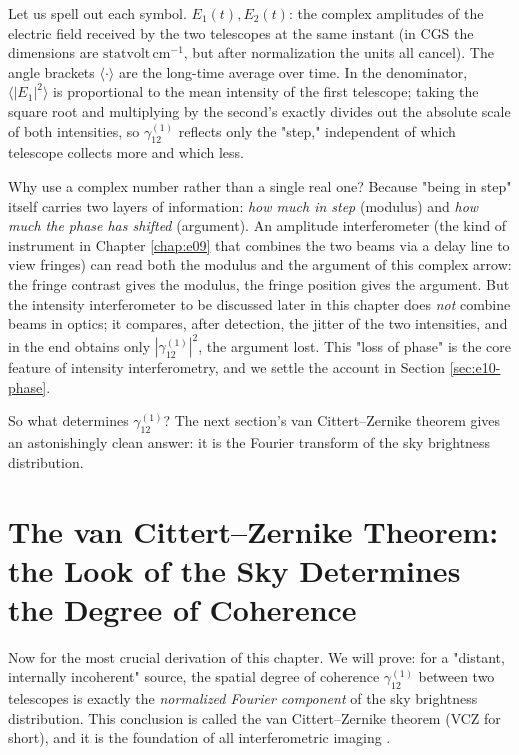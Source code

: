 Let us spell out each symbol. \(E_1(t),E_2(t)\): the complex amplitudes of the electric field received by the two telescopes at the same instant (in CGS the dimensions are \(\mathrm{statvolt\,cm^{-1}}\), but after normalization the units all cancel). The angle brackets \(\langle\cdot\rangle\) are the long-time average over time. In the denominator, \(\langle|E_1|^2\rangle\) is proportional to the mean intensity of the first telescope; taking the square root and multiplying by the second's exactly divides out the absolute scale of both intensities, so \(\gamma_{12}^{(1)}\) reflects only the "step," independent of which telescope collects more and which less.

Why use a complex number rather than a single real one? Because "being in step" itself carries two layers of information: \emph{how much in step} (modulus) and \emph{how much the phase has shifted} (argument). An amplitude interferometer (the kind of instrument in Chapter \ref{chap:e09} that combines the two beams via a delay line to view fringes) can read both the modulus and the argument of this complex arrow: the fringe contrast gives the modulus, the fringe position gives the argument. But the intensity interferometer to be discussed later in this chapter does \emph{not} combine beams in optics; it compares, after detection, the jitter of the two intensities, and in the end obtains only \(|\gamma_{12}^{(1)}|^2\), the argument lost. This "loss of phase" is the core feature of intensity interferometry, and we settle the account in Section \ref{sec:e10-phase}.

So what determines \(\gamma_{12}^{(1)}\)? The next section's van Cittert--Zernike theorem gives an astonishingly clean answer: it is the Fourier transform of the sky brightness distribution.

\section{The van Cittert--Zernike Theorem: the Look of the Sky Determines the Degree of Coherence}
\label{sec:e10-vcz}

Now for the most crucial derivation of this chapter. We will prove: for a "distant, internally incoherent" source, the spatial degree of coherence \(\gamma_{12}^{(1)}\) between two telescopes is exactly the \emph{normalized Fourier component} of the sky brightness distribution. This conclusion is called the van Cittert--Zernike theorem (VCZ for short), and it is the foundation of all interferometric imaging \citep{1938Phy.....5..785Z,1939Phy.....6.1129V}.

